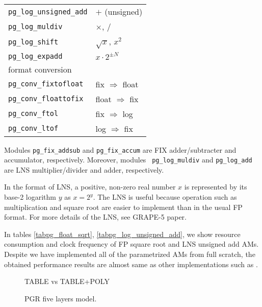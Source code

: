 \documentclass{article}
\begin{document}
\begin{table}[t]
\begin{minipage}[b]{1.0\linewidth}
\begin{center}
{\begin{tabular}{ll}
	{\tt pg\_log\_unsigned\_add}   &  $+$ (unsigned)\\
	{\tt pg\_log\_muldiv}          &  $\times$, $/$\\
	{\tt pg\_log\_shift}           &  $\sqrt{x}$, $x^2$\\
        {\tt pg\_log\_expadd}          &  $x \cdot 2^{\pm N}$\\
	\hline
	format conversion & \\
	{\tt pg\_conv\_fixtofloat}     &  fix $\Rightarrow$ float\\
	{\tt pg\_conv\_floattofix}     &  float $\Rightarrow$ fix\\
	{\tt pg\_conv\_ftol}           &  fix $\Rightarrow$ log\\
	{\tt pg\_conv\_ltof}           &  log $\Rightarrow$ fix\\
	\hline
\end{tabular}
}
\end{center}
\end{minipage}
\end{table}

Modules {\tt pg\_fix\_addsub} and {\tt pg\_fix\_accum} are FIX
adder/subtracter and accumulator, respectively.  Moreover, modules {\tt
pg\_log\_muldiv} and {\tt pg\_log\_add} are LNS multiplier/divider and
adder, respectively.

In the format of LNS, a positive,
non-zero real number $x$ is represented by its base-2 logarithm $y$ as
$x=2^{y}$.
The LNS is useful because operation such as multiplication and square root
are easier to implement than in the usual FP format.
For more details of the LNS, see GRAPE-5 paper\cite{KFMT00}.

In tables \ref{tabpg_float_sqrt}, \ref{tabpg_log_unsigned_add}, we show
resource consumption and clock frequency of FP square root and LNS unsigned add AMs.
Despite we have implemented all of the parametrized AMs
from full scratch, the obtained performance results
are almost same as other implementations such as \cite{LKM02}.



\begin{figure}[t]
\begin{minipage}[b]{1.0\linewidth}\centering
  \centerline{}
\end{minipage}
\caption{TABLE vs TABLE+POLY}\label{LADD_SLICE}
\end{figure}


\begin{figure}[t]
\begin{minipage}[b]{1.0\linewidth}\centering
  \centerline{}
\end{minipage}
\caption{PGR five layers model.}\label{fig5model}
\end{figure}
\end{document}
